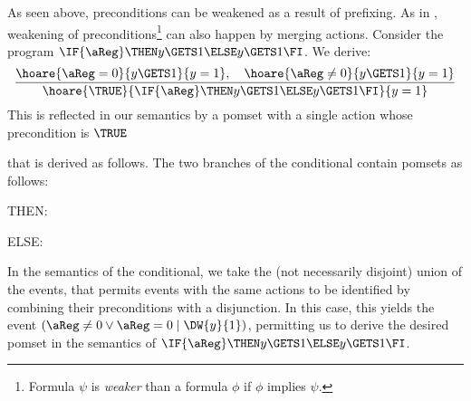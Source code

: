 As seen above, preconditions can be weakened as a result of prefixing.  As in
\citep{2019-sp}, weakening of preconditions\footnote{Formula $\psi$ is
  \emph{weaker} than a formula $\phi$ if $\phi$ implies $\psi$.} can also
happen by merging actions.
%
Consider the program $\IF{\aReg}\THEN y\GETS1 \ELSE y\GETS1\FI$.  We derive:
\[
\frac{\hoare{\aReg=0}{y\GETS1}{y=1}, \ \ \  \hoare{\aReg\neq0}{y\GETS1}{y=1}}
{\hoare{\TRUE}{\IF{\aReg}\THEN y\GETS1 \ELSE y\GETS1\FI}{y=1}}
\]
This is reflected in our semantics by a pomset with a single action whose precondition is $\TRUE$
\begin{tikzdisplay}[node distance=1em]{}
\end{tikzdisplay}
that is derived as follows.  The two branches of the conditional contain pomsets as follows:
\begin{displaymathsmall}
\mbox{THEN:}\;\;
\begin{tikzcenter}[node distance=1em]
\end{tikzcenter}
\qquad\qquad
\mbox{ELSE: }\;\;
\begin{tikzcenter}[node distance=1em]
\end{tikzcenter}
\end{displaymathsmall}
In the semantics of the conditional, we take the (not necessarily disjoint) union of the events, that permits events with the same actions to be identified by combining their  preconditions with a disjunction.  In this case, this yields the event $(\aReg\neq0\lor \aReg=0\mid\DW{y}{1})$, permitting us to derive the desired pomset in the semantics of
$\IF{\aReg}\THEN y\GETS1 \ELSE y\GETS1\FI$.


